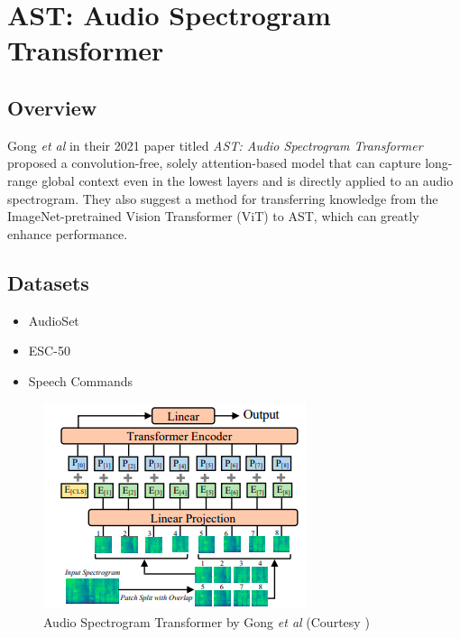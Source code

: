 \section{AST: Audio Spectrogram Transformer} \label{appendix:ast-paper}

\subsection{Overview}

\par Gong \textit{et al} in their 2021 paper titled \textit{AST: Audio Spectrogram Transformer} \cite{ast} proposed a convolution-free, solely attention-based model that can capture long-range global context even in the lowest layers and is directly applied to an audio spectrogram. They also suggest a method for transferring knowledge from the ImageNet-pretrained Vision Transformer (ViT) to AST, which can greatly enhance performance.\par

\subsection{Datasets}
\begin{itemize}
\item AudioSet
\item ESC-50 
\item Speech Commands
\end{itemize}

\begin{figure}[h]
	\centering
	\includegraphics[width=0.5\linewidth]{assets/img/ast_methodology.png}
	\caption{Audio Spectrogram Transformer by Gong
	\textit{et al} (Courtesy \cite{ast})}
\end{figure}

